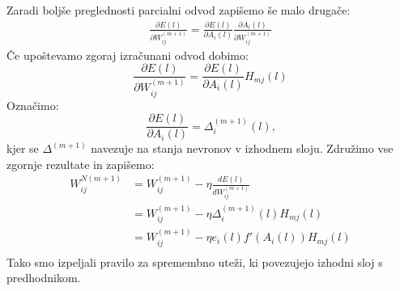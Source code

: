 \documentclass[mat1]{fmfdelo}
\begin{document}
Zaradi boljše preglednosti parcialni odvod zapišemo še malo drugače:
\begin{equation*}
\begin{aligned}
\frac{\partial E(l)}{\partial W^{(m+1)}_{ij}} = \frac{\partial E(l)}{\partial A_i(l)}\frac{\partial A_i(l)}{\partial W^{(m+1)}_{ij}} 
\end{aligned}
\end{equation*}
%
Če upoštevamo zgoraj izračunani odvod dobimo: 
%
\begin{equation*}
\frac{\partial E(l)}{\partial W^{(m+1)}_{ij}} = \frac{\partial E(l)}{\partial A_i(l)}H_{mj}(l) 
\end{equation*}
%
Označimo: 
%
\begin{equation}
\frac{\partial E(l)}{\partial A_i(l)} = \Delta^{(m+1)}_i(l)\text{,}
\label{eq:deltaY}
\end{equation}
%
kjer se $\Delta^{(m+1)}$ navezuje na stanja nevronov v izhodnem sloju.
%
Združimo vse zgornje rezultate in zapišemo:
%
\begin{equation}
\begin{aligned}
W^{N(m+1)}_{ij} &= W ^{(m+1)}_{ij}- \eta \frac{dE(l)}{dW_{ij}^{(m+1)}} \\
&= W ^{(m+1)}_{ij} -\eta  \Delta^{(m+1)}_i (l)H_{mj}(l)\\
&= W ^{(m+1)}_{ij} -\eta e_i(l) f'(A_i(l))H_{mj}(l)\\
\end{aligned}
\end{equation}
%
Tako smo izpeljali pravilo za spremembno uteži, ki povezujejo izhodni sloj s predhodnikom. 
\end{document}

